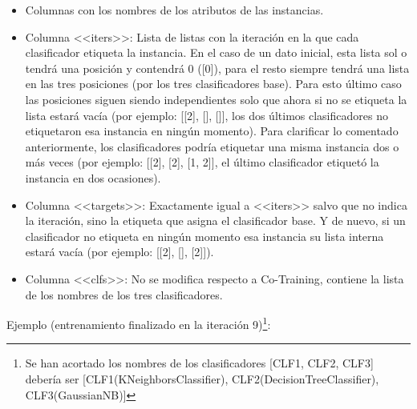 \begin{itemize}
    \item Columnas con los nombres de los atributos de las instancias.
    \item Columna <<iters>>: Lista de listas con la iteración en la que cada
    clasificador etiqueta la instancia. En el caso de un dato inicial, esta
    lista sol o tendrá una posición y contendrá 0 ([0]), para el resto siempre
    tendrá una lista en las tres posiciones (por los tres clasificadores base).
    Para esto último caso las posiciones siguen siendo independientes solo que
    ahora si no se etiqueta la lista estará vacía (por ejemplo: [[2], [], []],
    los dos últimos clasificadores no etiquetaron esa instancia en ningún
    momento). Para clarificar lo comentado anteriormente, los clasificadores
    podría etiquetar una misma instancia dos o más veces (por ejemplo: [[2], [2],
    [1, 2]], el último clasificador etiquetó la instancia en dos ocasiones).
    \item Columna <<targets>>: Exactamente igual a <<iters>> salvo que no indica
    la iteración, sino la etiqueta que asigna el clasificador base. Y de nuevo,
    si un clasificador no etiqueta en ningún momento esa instancia su lista
    interna estará vacía (por ejemplo: [[2], [], [2]]).
    \item Columna <<clfs>>: No se modifica respecto a Co-Training, contiene la
    lista de los nombres de los tres clasificadores.
\end{itemize}

Ejemplo (entrenamiento finalizado en la iteración 9)\footnote{Se han acortado los nombres de los clasificadores [CLF1, CLF2, CLF3]
debería ser [CLF1(KNeighborsClassifier), CLF2(DecisionTreeClassifier),
CLF3(GaussianNB)]}:
\begin{table}[H]
    \caption{Ejemplo de DataFrame de Tri-Training}
\end{table}

